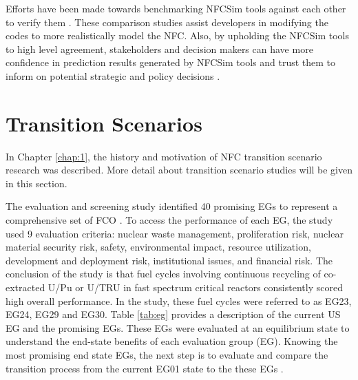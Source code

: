 Efforts have been made towards benchmarking \gls{NFCSim} 
tools against each other to verify them 
\cite{feng_standardized_2016,guerin_benchmark_2009}. 
These comparison studies assist developers in modifying the
codes to more realistically model the \gls{NFC}. 
Also, by upholding the \gls{NFCSim} tools to high level agreement, 
stakeholders and decision makers can have more confidence in 
prediction results generated by \gls{NFCSim} tools and trust them 
to inform on potential strategic and policy decisions
\cite{feng_standardized_2016}. 

\section{Transition Scenarios}
In Chapter \ref{chap:1}, the history and motivation of
\gls{NFC} transition scenario research was described.
More detail about transition scenario studies will be given 
in this section. 

The evaluation and screening study identified 40 promising 
\glspl{EG} to represent a comprehensive set of 
\gls{FCO} \cite{wigeland_nuclear_2014}. 
To access the performance of each \gls{EG}, the study
used 9 evaluation criteria: nuclear waste management, 
proliferation risk, nuclear material security risk, 
safety, environmental impact, resource utilization, 
development and deployment risk, institutional issues, and 
financial risk.  
The conclusion of the study is that fuel cycles
involving continuous recycling of co-extracted U/Pu or U/TRU in 
fast spectrum critical reactors consistently scored high overall 
performance.
In the study, these fuel cycles were referred to as EG23, EG24, 
EG29 and EG30. 
Table \ref{tab:eg} provides a description of the current 
\gls{US} \gls{EG} and the promising \glspl{EG}. 
These \glspl{EG} were evaluated at an equilibrium state to 
understand the end-state benefits of each evaluation group (EG).
Knowing the most promising end state \glspl{EG}, 
the next step is to evaluate and compare the transition process 
from the current EG01 
state to the these \glspl{EG} \cite{feng_standardized_2016}. 

